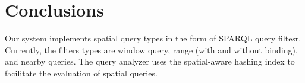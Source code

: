 \section{Conclusions}
Our system implements spatial query types in the form of SPARQL query filtesr. Currently, the filters types are window query, range (with and without binding), and nearby queries. The query analyzer uses the spatial-aware hashing index to facilitate the evaluation of spatial queries.

